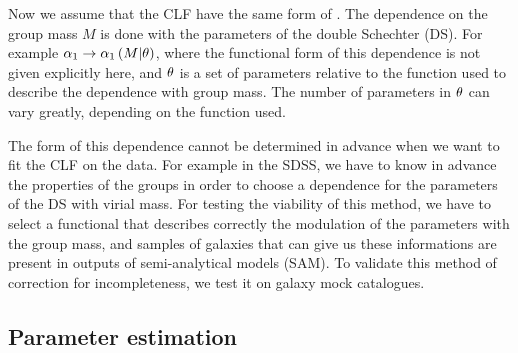 Now we assume that the CLF have the same form of . The
dependence on the group mass $M$ is done with the parameters of the double
Schechter (DS). For example
$\alpha_1\rightarrow\alpha_1\left(M|{\bf\theta}\right)$, where the functional
form of this dependence is not given explicitly here, and ${\bf\theta}$ is a
set of parameters relative to the function used to describe the dependence with
group mass. The number of parameters in ${\bf\theta}$ can vary greatly,
depending on the function used.

The form of this dependence cannot be determined in advance when we want to fit
the CLF on the data. For example in the SDSS, we have to know in advance the
properties of the groups in order to choose a dependence for the parameters of
the DS with virial mass. For testing the viability of this method, we have to
select a functional that describes correctly the modulation of the parameters
with the group mass, and samples of galaxies that can give us these
informations are present in outputs of semi-analytical models (SAM). To
validate this method of correction for incompleteness, we test it on galaxy
mock catalogues.

\subsection{Parameter estimation}

